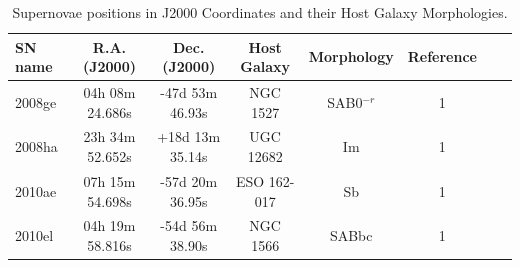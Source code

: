 \documentclass[preprint]{aastex}
\begin{document}
\begin{table}[htc]
	\caption{Supernovae positions in J2000 Coordinates and their Host Galaxy Morphologies.}
	\begin{tabular}{l*{6}{c}r}
		\hline\hline
		SN name & R.A. (J2000) & Dec. (J2000) & Host Galaxy  & Morphology & Reference  \\%
		\hline
		2008ge   & 04h 08m 24.686s & -47d 53m 46.93s    & NGC 1527           & SAB0$^{-r}$     & 1 \\%
		2008ha   & 23h 34m 52.652s   & +18d 13m 35.14s     & UGC 12682         &  Im                    & 1 \\%
		2010ae   & 07h 15m 54.698s   & -57d 20m 36.95s      & ESO 162-017  & Sb & 1 \\%
		2010el    & 04h 19m 58.816s   & -54d 56m 38.90s      & NGC 1566           & SABbc           & 1 \\%
		\hline
	\end{tabular}
	\label{tab:infogal}
\vspace*{-.5cm} 
\end{table}
\end{document}
